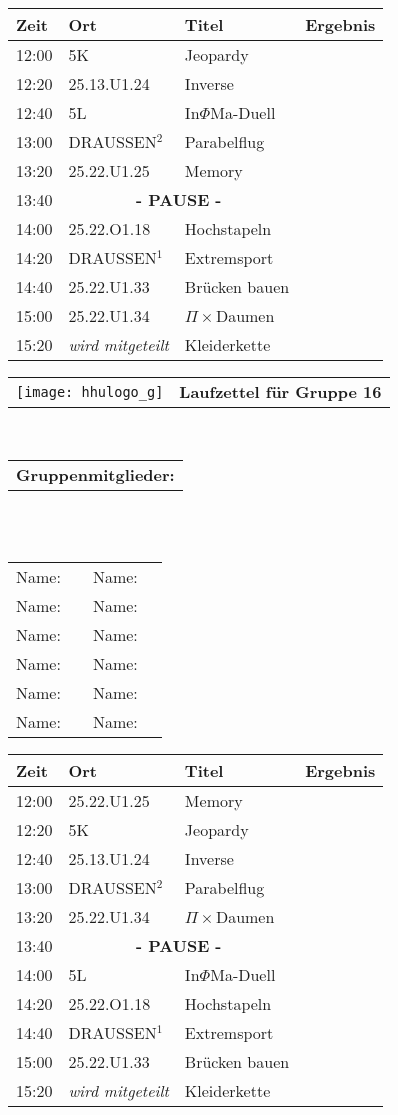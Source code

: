 \documentclass[a4paper,10pt]{article}
\def\spiela{25.22.U1.33 & Brücken bauen}
\def\spielb{DRAUSSEN$^1$ \footnotetext[1]{zwischen 25.22.U1 und 25.13.U1} & Extremsport}
\def\spielc{25.22.O1.18 & Hochstapeln}
\def\spield{5L & In$\Phi $Ma-Duell}
\def\spielee{ 25.13.U1.24 & Inverse}
\def\spielf{5K & Jeopardy}
\def\spielgg{25.22.U1.25 & Memory}
\def\spielh{DRAUSSEN$^2$ \footnotetext[2]{zwischen 25.22.U1 und 25.33.U1} & Parabelflug}
\def\spieli{ 25.22.U1.34 & $\Pi \times $Daumen}
\def\spielj{\textit{wird mitgeteilt} & Kleiderkette}
\def\pause{\multicolumn{2}{|c|}{\textbf{- PAUSE -}}}
\newcommand{\oben}[1]{

\begin{tabularx}{\textwidth}{lc}
  \texttt{[image: hhulogo\_g]}
& {\Huge \textbf{Laufzettel für Gruppe #1}}
\end{tabularx}
\large
\vspace{0.5cm} \\
\begin{tabularx}{\textwidth}{l}\textbf{Gruppenmitglieder:} \end{tabularx}\\ \phantom{blub}\\
\begin{tabularx}{\textwidth}{p{0.1\textwidth}p{0.4\textwidth}p{0.1\textwidth}p{0.4\textwidth}}
Name: & \underline{\hspace{6cm}} & Name: & \underline{\hspace{6cm}}\\
Name: & \underline{\hspace{6cm}} & Name: & \underline{\hspace{6cm}}\\
Name: & \underline{\hspace{6cm}} & Name: & \underline{\hspace{6cm}}\\
Name: & \underline{\hspace{6cm}} & Name: & \underline{\hspace{6cm}}\\
Name: & \underline{\hspace{6cm}} & Name: & \underline{\hspace{6cm}}\\
Name: & \underline{\hspace{6cm}} & Name: & \underline{\hspace{6cm}}\\
\end{tabularx}



}
\begin{document}
  \LARGE
  \begin{center}
  \vspace{1cm}
  \begin{tabularx}{\textwidth}{p{2.5cm}||p{4.5cm}|p{6.5cm}|l}

  \textbf{Zeit}  & \textbf{Ort} 	&\textbf{Titel} 		& \textbf{Ergebnis} 	\\ \hline \hline

  12:00 &\spielf			&		\\ \hline
  12:20 &\spielee			&		\\ \hline
  12:40 &\spield			&		\\ \hline

  13:00 &\spielh		 	&		\\ \hline
  13:20 &\spielgg			&		\\ \hline
  13:40 &\pause			&		\\ \hline

  14:00 &\spielc			&		\\ \hline
  14:20 &\spielb			&		\\ \hline
  14:40 &\spiela			&		\\ \hline 

  15:00 &\spieli			&		\\ \hline \hline
  15:20 &\spielj			&

  \end{tabularx}
  \end{center}

  \newpage


  \oben{16}

  \LARGE
  \begin{center}
  \vspace{1cm}
  \begin{tabularx}{\textwidth}{p{2.5cm}||p{4.5cm}|p{6.5cm}|l}

  \textbf{Zeit}  & \textbf{Ort} 	&\textbf{Titel} 		& \textbf{Ergebnis} 	\\ \hline \hline

  12:00 &\spielgg			&		\\ \hline
  12:20 &\spielf			&		\\ \hline
  12:40 &\spielee			&		\\ \hline

  13:00 &\spielh		 	&		\\ \hline
  13:20 &\spieli			&		\\ \hline
  13:40 &\pause			&		\\ \hline

  14:00 &\spield			&		\\ \hline
  14:20 &\spielc			&		\\ \hline
  14:40 &\spielb			&		\\ \hline 

  15:00 &\spiela			&		\\ \hline \hline
  15:20 &\spielj			&

  \end{tabularx}
  \end{center}
\end{document}
